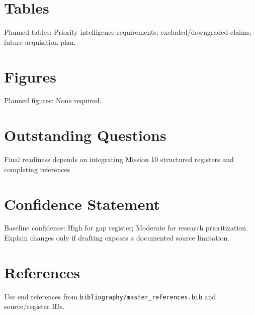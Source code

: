 \section{Tables}
Planned tables: Priority intelligence requirements; excluded/downgraded claims; future acquisition plan.

\section{Figures}
Planned figures: None required.

\section{Outstanding Questions}
Final readiness depends on integrating Mission 10 structured registers and completing references

\section{Confidence Statement}
Baseline confidence: High for gap register; Moderate for research prioritization. Explain changes only if drafting exposes a documented source limitation.

\section{References}
Use end references from \texttt{bibliography/master_references.bib} and source/register IDs.
